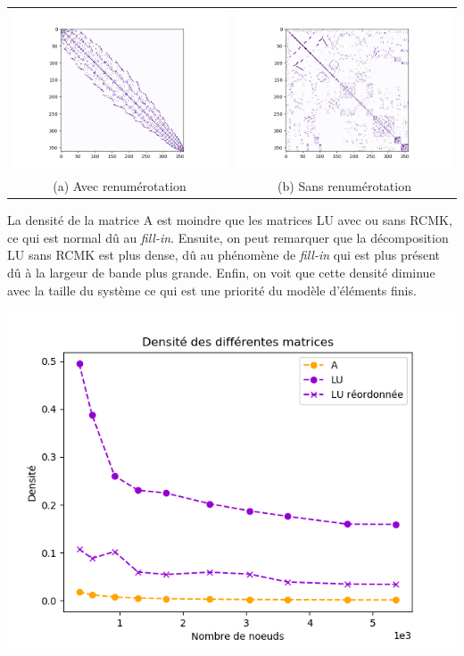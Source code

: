 \documentclass{article}[11pt]
\begin{document}
\begin{minipage}{0.5\textwidth}
    \centering
    \begin{tabular}{cc}
      \includegraphics[width=.4\linewidth]{res/matrix/RCMK/Statique361.png} &
      \includegraphics[width=.4\linewidth]{res/matrix/Standard/Statique361.png} \\
      (a) Avec renumérotation & (b) Sans renumérotation \\
    \end{tabular}
    La densité de la matrice A est moindre que les matrices LU avec ou sans RCMK, ce qui est normal dû au \textit{fill-in}. Ensuite, on peut remarquer que la décomposition LU sans RCMK est plus dense, dû au phénomène de \textit{fill-in} qui est plus présent dû à la largeur de bande plus grande. Enfin, on voit que cette densité diminue avec la taille du système ce qui est une priorité du modèle d'éléments finis.
\end{minipage}
\begin{minipage}{0.5\textwidth}
    \includegraphics[width=\textwidth]{res/plots/DensityRCMK.png}
\end{minipage}
\end{document}
